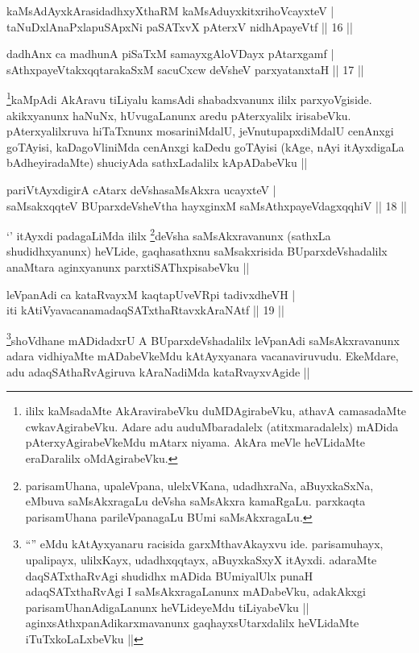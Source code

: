 \begin{shl}
kaMsAdAyxkArasidadhxyXthaRM kaMsAduyxkitxrihoVcayxteV | \\
taNuDxlAnaPxlapuSApxNi paSATxvX pAterxV nidhApayeVtf \hfill|| 16 || 
\end{shl}

\begin{shl}
dadhAnx ca madhunA piSaTxM samayxgAloVDayx pAtarxgamf | \\
sAthxpayeVtakxqqtarakaSxM sacuCxcw deVsheV parxyatanxtaH \hfill|| 17 || 
\end{shl}

\begin{artha}
\footnote{ililx kaMsadaMte AkAravirabeVku duMDAgirabeVku, athavA camasadaMte cwkavAgirabeVku. Adare adu auduMbaradalelx (atitxmaradalelx) mADida pAterxyAgirabeVkeMdu mAtarx niyama. AkAra meVle heVLidaMte eraDaralilx oMdAgirabeVku.}kaMpAdi AkAravu tiLiyalu kamsAdi shabadxvanunx ililx parxyoVgiside. akikxyanunx haNuNx, hUvugaLanunx aredu pAterxyalilx irisabeVku. pAterxyalilxruva hiTaTxnunx mosariniMdalU, jeVnutupapxdiMdalU cenAnxgi goTAyisi, kaDagoVliniMda cenAnxgi kaDedu goTAyisi (kAge, nAyi itAyxdigaLa bAdheyiradaMte) shuciyAda sathxLadalilx kApADabeVku ||
\end{artha}


\begin{shl}
pariVtAyxdigirA cAtarx deVshasaMsAkxra ucayxteV | \\
saMsakxqqteV BUparxdeVsheV\s tha hayxginxM saMsAthxpayeVdagxqqhiV \hfill|| 18 || 
\end{shl}

\begin{artha}
`\stext' itAyxdi padagaLiMda ililx \footnote{parisamUhana, upaleVpana, ulelxVKana, udadhxraNa, aBuyxkaSxNa, eMbuva saMsAkxragaLu deVsha saMsAkxra kamaRgaLu. parxkaqta parisamUhana parileVpanagaLu BUmi saMsAkxragaLu.}deVsha saMsAkxravanunx (sathxLa shudidhxyanunx) heVLide, gaqhasathxnu saMsakxrisida BUparxdeVshadalilx anaMtara aginxyanunx parxtiSAThxpisabeVku ||
\end{artha}

\begin{shl}
leVpanAdi ca kataRvayxM kaqtapUveVR\s pi tadivxdheVH | \\
iti kAtiVyavacanamadaqSATxthaRtavxkAraNAtf \hfill|| 19 || 
\end{shl}

\begin{artha}
\footnote{``\stext'' eMdu kAtAyxyanaru racisida garxMthavAkayxvu ide. parisamuhayx, upalipayx, ulilxKayx, udadhxqqtayx, aBuyxkaSxyX itAyxdi. adaraMte daqSATxthaRvAgi shudidhx mADida BUmiyalUlx punaH adaqSATxthaRvAgi I saMsAkxragaLanunx mADabeVku, adakAkxgi parisamUhanAdigaLanunx heVLideyeMdu tiLiyabeVku || aginxsAthxpanAdikarxmavanunx gaqhayxsUtarxdalilx heVLidaMte iTuTxkoLaLxbeVku ||}shoVdhane mADidadxrU A BUparxdeVshadalilx leVpanAdi saMsAkxravanunx adara vidhiyaMte mADabeVkeMdu kAtAyxyanara vacanaviruvudu. EkeMdare, adu adaqSAthaRvAgiruva kAraNadiMda kataRvayxvAgide ||
\end{artha}


